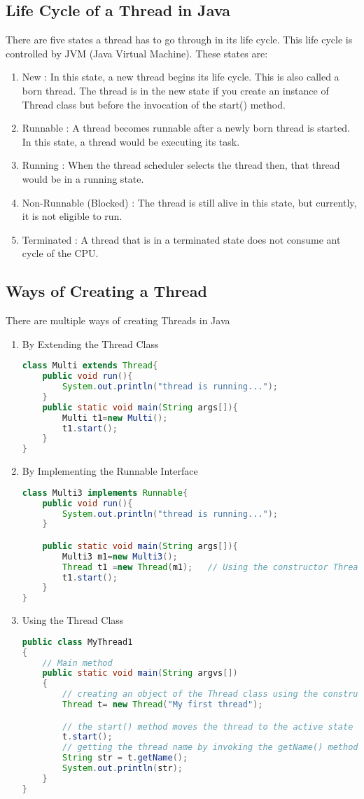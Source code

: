 \documentclass[11pt]{article}
\begin{document}
\subsection{Life Cycle of a Thread in Java}
There are five states a thread has to go through in its life cycle. This life cycle is controlled by JVM (Java Virtual Machine). These states are:
\begin{enumerate}
	\item New : In this state, a new thread begins its life cycle. This is also called a born thread. The thread is in the new state if you create an instance of Thread class but before the invocation of the start() method.
	\item Runnable : A thread becomes runnable after a newly born thread is started. In this state, a thread would be executing its task.
	\item Running : When the thread scheduler selects the thread then, that thread would be in a running state.
	\item Non-Runnable (Blocked) : The thread is still alive in this state, but currently, it is not eligible to run.
	\item Terminated : A thread that is in a terminated state does not consume ant cycle of the CPU.
\end{enumerate}

\subsection{Ways of Creating a Thread}
There are multiple ways of creating Threads in Java
\begin{enumerate}
	\item By Extending the Thread Class
	\begin{lstlisting}[language=Java]
class Multi extends Thread{  
	public void run(){  
		System.out.println("thread is running...");  
	}  
	public static void main(String args[]){  
		Multi t1=new Multi();  
		t1.start();  
	}  
}  		
	\end{lstlisting}
	\item By Implementing the Runnable Interface
	\begin{lstlisting}[language=Java]
class Multi3 implements Runnable{  
	public void run(){  
		System.out.println("thread is running...");  
	}  

	public static void main(String args[]){  
		Multi3 m1=new Multi3();  
		Thread t1 =new Thread(m1);   // Using the constructor Thread(Runnable r)  
		t1.start();  
	}   
}
	\end{lstlisting}
\item Using the Thread Class
\begin{lstlisting}[language=Java]
public class MyThread1  
{
	// Main method  
	public static void main(String argvs[])  
	{  
		// creating an object of the Thread class using the constructor Thread(String name)   
		Thread t= new Thread("My first thread");  

		// the start() method moves the thread to the active state  
		t.start();  
		// getting the thread name by invoking the getName() method  
		String str = t.getName();  
		System.out.println(str);  
	}  
}  
\end{lstlisting}
\end{enumerate}
\end{document}
